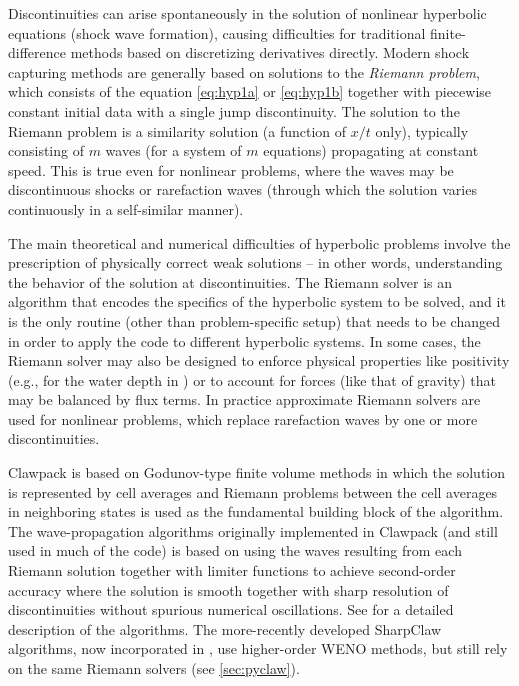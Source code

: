 
Discontinuities can arise spontaneously in the solution of nonlinear
hyperbolic equations (shock wave formation), causing difficulties for
traditional finite-difference methods based on discretizing derivatives
directly.   Modern shock capturing methods are generally based on solutions
to the {\em Riemann problem}, which consists of the equation 
\cref{eq:hyp1a} or \cref{eq:hyp1b}
together with piecewise constant initial data with a single jump discontinuity.
The solution to the Riemann problem is a similarity
solution (a function of $x/t$ only),
typically consisting of $m$ waves (for a system of $m$ equations)
propagating at constant speed.  This is true even for nonlinear problems,
where the waves may be discontinuous shocks or rarefaction waves
(through which the solution varies continuously in a self-similar manner).

The main theoretical
and numerical difficulties of hyperbolic problems involve the prescription of
physically correct weak solutions -- in other words, understanding the behavior
of the solution at discontinuities.  The Riemann solver is an algorithm that
encodes the specifics of the hyperbolic system to be solved, and it is the only
routine (other than problem-specific setup) that needs to be changed in order
to apply the code to different hyperbolic systems.  In some cases, the Riemann
solver may also be designed to enforce physical properties like positivity
(e.g., for the water depth in \geoclaw) or to account for forces (like that
of gravity) that may be balanced by flux terms.
In practice approximate Riemann solvers are used for nonlinear
problems, which replace rarefaction waves by one or more discontinuities.

Clawpack is based on Godunov-type finite volume methods in which
the solution is represented by cell averages and Riemann problems
between the cell averages in neighboring states is used as the
fundamental building block of the algorithm.
The wave-propagation algorithms originally
implemented in Clawpack (and still used in much of the code) is based on
using the waves resulting from each Riemann solution together with limiter
functions to achieve second-order accuracy where the solution is smooth
together with sharp resolution of discontinuities without spurious numerical
oscillations. See \cite{rjl:fvmhp} for a detailed description of the
algorithms.   The more-recently developed SharpClaw algorithms,
now incorporated in
\pyclaw, use higher-order WENO methods, but still rely on the same Riemann
solvers (see \cref{sec:pyclaw}).  

